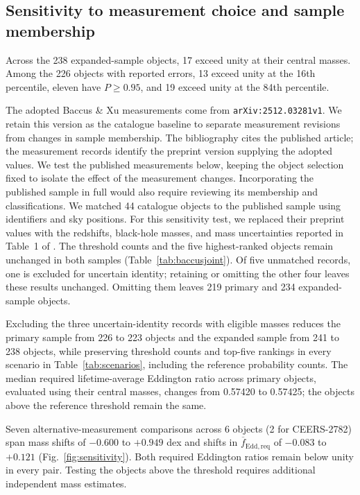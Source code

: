 \documentclass[pdflatex,sn-basic]{sn-jnl}
\begin{document}
\subsection{Sensitivity to measurement choice and sample membership}
\label{app:measurement-checks}

Across the 238 expanded-sample objects, 17 exceed unity at their central
masses. Among the 226 objects with reported errors, 13 exceed unity at the
16th percentile, eleven have $P\geq0.95$, and 19 exceed unity at the
84th percentile.

The adopted Baccus \& Xu measurements come from \texttt{arXiv:2512.03281v1}.
We retain this version as the catalogue baseline to separate measurement
revisions from changes in sample membership. The bibliography cites the published article; the measurement records
identify the preprint version supplying the adopted values. We test the
published measurements below, keeping the object selection fixed to isolate
the effect of the measurement changes. Incorporating the published sample
in full would also require reviewing its membership and classifications.
We matched 44 catalogue objects to the published sample using identifiers
and sky positions. For this sensitivity test, we replaced their preprint values with
the redshifts, black-hole masses, and mass uncertainties reported in Table~1
of \citet{baccus2026}. The threshold counts and the five highest-ranked objects
remain unchanged in both samples (Table~\ref{tab:baccusjoint}). Of five
unmatched records, one is excluded for uncertain identity; retaining or
omitting the other four leaves these results unchanged. Omitting them leaves
219 primary and 234 expanded-sample objects.




Excluding the three uncertain-identity records with eligible masses reduces
the primary sample from 226 to 223 objects and the
expanded sample from 241 to 238 objects, while preserving threshold counts
and top-five rankings in every scenario in Table~\ref{tab:scenarios},
including the reference probability counts. The median required
lifetime-average Eddington ratio across primary objects, evaluated using
their central masses, changes from 0.57420 to 0.57425; the objects above the
reference threshold remain the same.


Seven alternative-measurement comparisons across 6 objects (2 for CEERS-2782)
span mass shifts of $-0.600$ to $+0.949$ dex and shifts in $\overline{f}_{\mathrm{Edd,req}}$ of
$-0.083$ to $+0.121$ (Fig.~\ref{fig:sensitivity}). Both required Eddington ratios remain below
unity in every pair. Testing the objects above the threshold requires
additional independent mass estimates.
\end{document}
